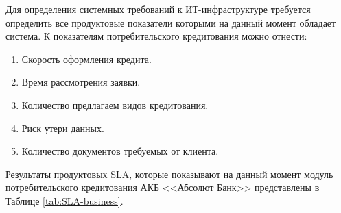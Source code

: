 \documentclass[14pt, a4paper]{extarticle}
\begin{document}
Для определения системных требований к ИТ-инфраструктуре требуется определить
все продуктовые показатели которыми на данный момент обладает система. К
показателям потребительского кредитования можно отнести:
\begin{enumerate}
	\item Скорость оформления кредита.
	\item Время рассмотрения заявки.
	\item Количество предлагаем видов кредитования.
	\item Риск утери данных.
	\item Количество документов требуемых от клиента.
\end{enumerate}

Результаты продуктовых SLA, которые показывают на данный момент модуль
потребительского кредитования АКБ <<Абсолют Банк>> представлены в Таблице
\ref{tab:SLA-business}.
\end{document}
